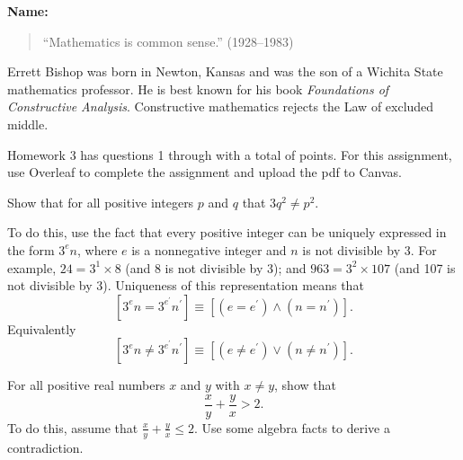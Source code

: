 \documentclass[12pt,fleqn,answers]{exam}
\newcommand{\quiz}{3}
\newcommand{\term}{Spring}
\begin{document}
\large
\vspace{0.1in}
\noindent{}
{\bf Name:}  \\
\noindent \makebox[3.0truein][l]{\bf Homework \quiz, \term \/ \the\year}
\vspace{0.1in}

\begin{quote}
 ``Mathematics is common sense.'' \hfill {} (1928--1983)
\end{quote}
Errett Bishop was born in Newton, Kansas and was the son of a Wichita State
mathematics professor. He is best known for his book \emph{Foundations of Constructive Analysis}.
Constructive mathematics rejects the Law of excluded middle.

\begin{quote}
    \end{quote}
\noindent  Homework    \quiz\/  has questions 1 through  \numquestions \/ with 
a total of  \numpoints\/  points. For this assignment, use Overleaf to 
complete the assignment and upload the pdf to Canvas.


\vspace{0.1in}


\begin{questions} 

\question [5] Show that for all positive integers $p$ and $q$ that
$3 q^2 \neq p^2$.  

To do this, use the fact that every positive integer can be
uniquely expressed in the form $3^e n$, where $e$ is a nonnegative
integer and $n$ is not divisible by 3. For example, $24 = 3^1 \times 8$
(and 8 is not divisible by 3); and $963 = 3^2 \times 107$ 
(and 107 is not divisible by 3). Uniqueness of this representation
means that
\begin{equation*}
  \left[3^e n = 3^{e^\prime} n^\prime \right] \equiv
  \left[(e = e^\prime) \land (n = n^\prime) \right].
\end{equation*}
Equivalently
\begin{equation*}
    \left[3^e n \neq  3^{e^\prime} n^\prime \right] \equiv
    \left[(e \neq e^\prime) \lor (n \neq n^\prime) \right].
  \end{equation*}

\begin{solution}

\end{solution}

\question [5] For all positive real numbers $x$ and $y$ with $x \neq y$, show that
\begin{equation*}
   \frac{x}{y} + \frac{y}{x} > 2.
\end{equation*}
To do this, assume that $\frac{x}{y} + \frac{y}{x} \leq   2.$ Use some
algebra facts to derive a contradiction.
\end{questions}
\end{document}
